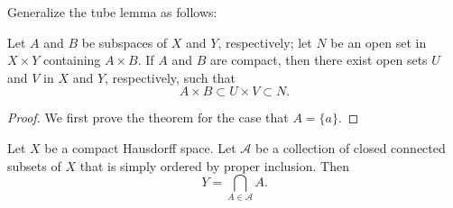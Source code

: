 \newpage
\begin{problem}[Munkres \S26, Ex.\,9]
Generalize the tube lemma as follows:
\begin{theorem*}
Let $A$ and $B$ be subspaces of $X$ and $Y$, respectively; let
$N$ be an open set in $X\times Y$ containing $A\times B$. If $A$
and $B$ are compact, then there exist open sets $U$ and $V$ in
$X$ and $Y$, respectively, such that
\[A\times B\subset U\times V\subset N.\]
\end{theorem*}
\end{problem}
\begin{proof}
We first prove the theorem for the case that $A=\{a\}$.



\end{proof}
\newpage
\begin{problem}[Munkres \S26, Ex.\,12]
\begin{theorem*}
Let $X$ be a compact Hausdorff space. Let $\mathcal{A}$ be a
collection of closed connected subsets of $X$ that is simply
ordered by proper inclusion. Then
\[Y=\bigcap_{A\in\mathcal{A}}A.\]
\end{theorem*}
\end{problem}
